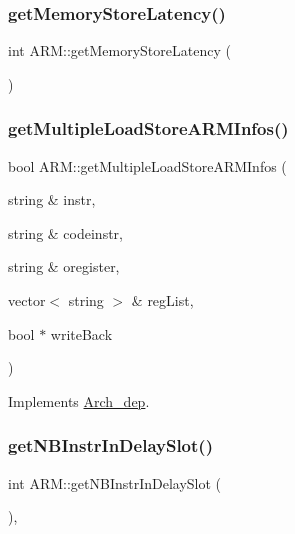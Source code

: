 \subsubsection{\texorpdfstring{get\+Memory\+Store\+Latency()}{getMemoryStoreLatency()}}
{\footnotesize\ttfamily int A\+R\+M\+::get\+Memory\+Store\+Latency (\begin{DoxyParamCaption}{ }\end{DoxyParamCaption})}

\mbox{\label{classARM_a8dc99512e617606f2fb5386b59a8ae47}} 
\subsubsection{\texorpdfstring{get\+Multiple\+Load\+Store\+A\+R\+M\+Infos()}{getMultipleLoadStoreARMInfos()}}
{\footnotesize\ttfamily bool A\+R\+M\+::get\+Multiple\+Load\+Store\+A\+R\+M\+Infos (\begin{DoxyParamCaption}\item[{string \&}]{instr,  }\item[{string \&}]{codeinstr,  }\item[{string \&}]{oregister,  }\item[{vector$<$ string $>$ \&}]{reg\+List,  }\item[{bool $\ast$}]{write\+Back }\end{DoxyParamCaption})\hspace{0.3cm}{\ttfamily [virtual]}}



Implements \hyperlink{classArch__dep_a6d74b532181cea3a40eb28b262a9f6f5}{Arch\+\_\+dep}.

\mbox{\label{classARM_a3df5e5b89546f7dfa9e50dc9f8c3518b}} 
\subsubsection{\texorpdfstring{get\+N\+B\+Instr\+In\+Delay\+Slot()}{getNBInstrInDelaySlot()}}
{\footnotesize\ttfamily int A\+R\+M\+::get\+N\+B\+Instr\+In\+Delay\+Slot (\begin{DoxyParamCaption}{ }\end{DoxyParamCaption})\hspace{0.3cm}{\ttfamily [inline]}, {\ttfamily [virtual]}}

